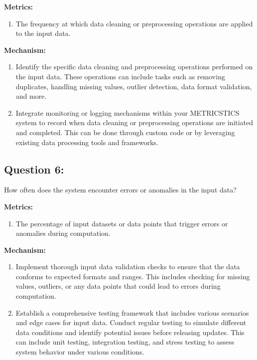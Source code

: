 \documentclass[12pt,letterpaper]{report}
\begin{document}
\item \textbf{Metrics:}

\begin{enumerate}
        \item The frequency at which data cleaning or preprocessing operations are applied to the input data.
\end{enumerate}

\item \textbf{Mechanism:}
\begin{enumerate}
        \item  Identify the specific data cleaning and preprocessing operations performed on the input data. These operations can include tasks such as removing duplicates, handling missing values, outlier detection, data format validation, and more.

        \item Integrate monitoring or logging mechanisms within your METRICSTICS system to record when data cleaning or preprocessing operations are initiated and completed. This can be done through custom code or by leveraging existing data processing tools and frameworks.
\end{enumerate}

\subsection*{Question 6:} How often does the system encounter errors or anomalies in the input data?

\item \textbf{Metrics:}

\begin{enumerate}
        \item The percentage of input datasets or data points that trigger errors or anomalies during computation.
\end{enumerate}

\item \textbf{Mechanism:}
\begin{enumerate}
        \item Implement thorough input data validation checks to ensure that the data conforms to expected formats and ranges. This includes checking for missing values, outliers, or any data points that could lead to errors during computation.

        \item Establish a comprehensive testing framework that includes various scenarios and edge cases for input data. Conduct regular testing to simulate different data conditions and identify potential issues before releasing updates. This can include unit testing, integration testing, and stress testing to assess system behavior under various conditions.
\end{enumerate}
\end{document}
